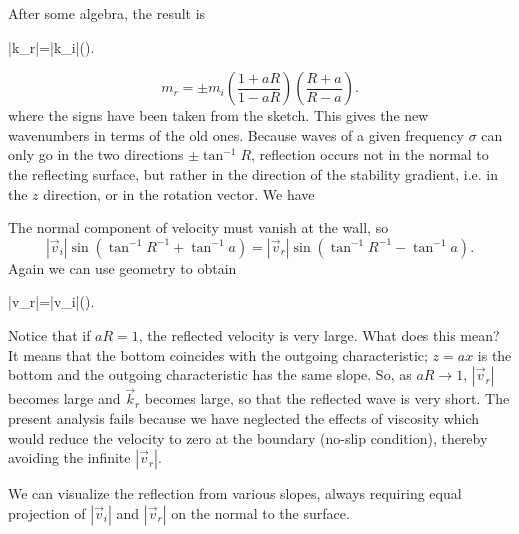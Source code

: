After some algebra, the result is
\begin{waveequation}
	|\vec k_r|=|\vec k_i|\left(\right).
\end{waveequation}
\[
	m_r=\pm m_i\left(\frac{1+aR}{1-aR}\right)
	\left(\frac{R+a}{R-a}\right).
\]
where the signs have been taken from the sketch. This gives the new wavenumbers in
terms of the old ones. Because waves of a given frequency $\sigma$ can only go in the two
directions $\pm\tan^{-1}R$, reflection occurs not in the normal to the reflecting surface, but
rather in the direction of the stability gradient, i.e. in the $z$ direction, or in the
rotation vector. We have


The normal component of velocity must vanish at the wall, so
\[
	|\vec v_i|\sin(\tan^{-1}R^{-1}+\tan^{-1}a)
	=|\vec v_r|\sin(\tan^{-1}R^{-1}-\tan^{-1}a).
\]
Again we can use geometry to obtain
\begin{waveequation}
	|\vec v_r|=|\vec v_i|\left(\right).
\end{waveequation}

\sourcepagebreak

Notice that if $aR=1$, the reflected velocity is very large. What does this mean?
It means that the bottom coincides with the outgoing characteristic; $z=ax$ is the
bottom and the outgoing characteristic has the same slope. So, as $aR\to1$,
$|\vec v_r|$ becomes large and $\vec k_r$ becomes large, so that the reflected wave is very short. The present analysis
fails because we have neglected the effects of viscosity which would reduce the velocity
to zero at the boundary (no-slip condition), thereby avoiding the infinite $|\vec v_r|$.

We can visualize the reflection from various slopes, always requiring equal
projection of $|\vec v_i|$ and $|\vec v_r|$ on the normal to the surface.


\sourcepagebreak

